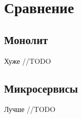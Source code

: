 \section{Сравнение}

\subsection{Монолит}
    Хуже
    //TODO

\subsection{Микросервисы}
    Лучше
    //TODO
    
        
\clearpage